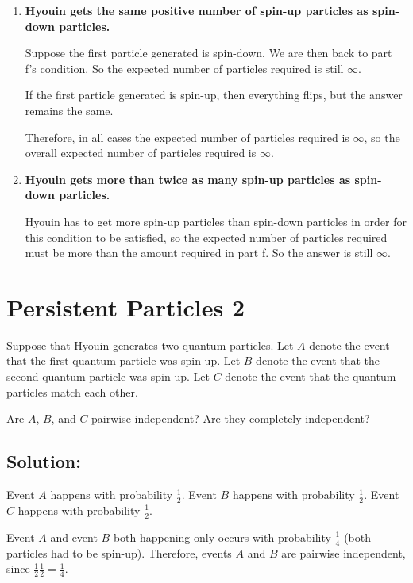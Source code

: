 \documentclass{article}
\begin{document}
\begin{enumerate}[label=(\alph*)]
    \vspace{1cm}
    
    \item \textbf{Hyouin gets the same positive number of spin-up particles as spin-down particles.}
    
    Suppose the first particle generated is spin-down. We are then back to part f's condition. So the expected number of particles required is still $\infty$.
    
    If the first particle generated is spin-up, then everything flips, but the answer remains the same.
    
    Therefore, in all cases the expected number of particles required is $\infty$, so the overall expected number of particles required is $\boxed{\infty}$.

    \vspace{1cm}
    
    \item \textbf{Hyouin gets more than twice as many spin-up particles as spin-down particles.}
    
    Hyouin has to get more spin-up particles than spin-down particles in order for this condition to be satisfied, so the expected number of particles required must be more than the amount required in part f. So the answer is still $\boxed{\infty}$.
\end{enumerate}

\newpage

\section{Persistent Particles 2}

Suppose that Hyouin generates two quantum particles. Let $A$ denote the event that the first quantum particle was spin-up. Let $B$ denote the event that the second quantum particle was spin-up. Let $C$ denote the event that the quantum particles match each other.

Are $A$, $B$, and $C$ pairwise independent? Are they completely independent?

\subsection{Solution:}

Event $A$ happens with probability $\frac{1}{2}$. Event $B$ happens with probability $\frac{1}{2}$. Event $C$ happens with probability $\frac{1}{2}$.

Event $A$ and event $B$ both happening only occurs with probability $\frac{1}{4}$ (both particles had to be spin-up). Therefore, events $A$ and $B$ are pairwise independent, since $\frac{1}{2} \frac{1}{2} = \frac{1}{4}$.
\end{document}
